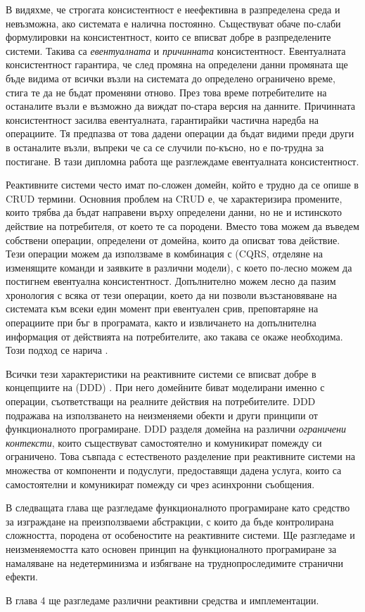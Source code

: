 В  видяхме, че строгата консистентност е неефективна в разпределена среда и невъзможна, ако системата е налична постоянно. Съществуват обаче по-слаби формулировки на консистентност, които се вписват добре в разпределените системи. Такива са \emph{евентуалната} и \emph{причинната} консистентност. Евентуалната консистентност гарантира, че след промяна на определени данни промяната ще бъде видима от всички възли на системата до определено ограничено време, стига те да не бъдат променяни отново. През това време потребителите на останалите възли е възможно да виждат по-стара версия на данните. Причинната консистентност засилва евентуалната, гарантирайки частична наредба на операциите. Тя предпазва от това дадени операции да бъдат видими преди други в останалите възли, въпреки че са се случили по-късно, но е по-трудна за постигане. В тази дипломна работа ще разглеждаме евентуалната консистентност.

Реактивните системи често имат по-сложен домейн, който е трудно да се опише в CRUD термини. Основния проблем на CRUD е, че характеризира промените, които трябва да бъдат направени върху определени данни, но не и истинското действие на потребителя, от което те са породени. Вместо това можем да въведем собствени операции, определени от домейна, които да описват това действие. Тези операции можем да използваме в комбинация с  (CQRS, отделяне на изменящите команди и заявките в различни модели), с което по-лесно можем да постигнем евентуална консистентност. Допълнително можем лесно да пазим хронология с всяка от тези операции, което да ни позволи възстановяване на системата към всеки един момент при евентуален срив, преповтаряне на операциите при бъг в програмата, както и извличането на допълнителна информация от действията на потребителите, ако такава се окаже необходима. Този подход се нарича .

Всички тези характеристики на реактивните системи се вписват добре в концепциите на  (DDD) \cite{evans2003DDD}. При него домейните биват моделирани именно с операции, съответстващи на реалните действия на потребителите. DDD подражава на използването на неизменяеми обекти и други принципи от функционалното програмиране. DDD разделя домейна на различни \emph{ограничени контексти}, които съществуват самостоятелно и комуникират помежду си ограничено. Това съвпада с естественото разделение при реактивните системи на множества от компоненти и подуслуги, предоставящи дадена услуга, които са самостоятелни и комуникират помежду си чрез асинхронни съобщения.

\begin{chapterend}
  В следващата глава ще разгледаме функционалното програмиране като средство за изграждане на преизползваеми абстракции, с които да бъде контролирана сложността, породена от особеностите на реактивните системи. Ще разгледаме и неизменяемостта като основен принцип на функционалното програмиране за намаляване на недетерминизма и избягване на труднопроследимите странични ефекти.
  
  В глава 4 ще разгледаме различни реактивни средства и имплементации.
\end{chapterend}
